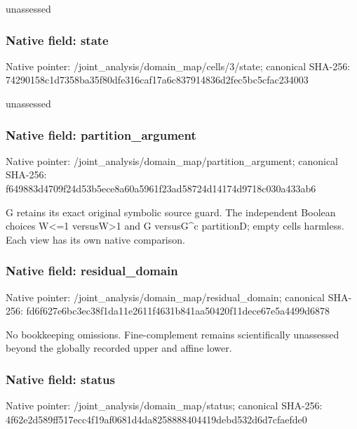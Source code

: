 \documentclass[10pt,a4paper]{article}
\begin{document}
\begingroup\raggedright\sloppy unassessed\par\endgroup

\subsubsection{Native field: state}
Native pointer: /joint\_\allowbreak{}analysis/domain\_\allowbreak{}map/cells/3/state; canonical SHA-256: 74290158c1d7358ba35f80dfe316caf17a6c837914836d2fec5bc5cfac234003

\begingroup\raggedright\sloppy unassessed\par\endgroup

\subsubsection{Native field: partition\_\allowbreak{}argument}
Native pointer: /joint\_\allowbreak{}analysis/domain\_\allowbreak{}map/partition\_\allowbreak{}argument; canonical SHA-256: f649883d4709f24d53b5ece8a60a5961f23ad58724d14174d9718c030a433ab6

\begingroup\raggedright\sloppy G retains its exact original symbolic source guard. The independent Boolean choices W<=\allowbreak{}1 versusW>1 and G versusG\textasciicircum{}c partitionD;\allowbreak{} empty cells harmless. Each view has its own native comparison.\par\endgroup

\subsubsection{Native field: residual\_\allowbreak{}domain}
Native pointer: /joint\_\allowbreak{}analysis/domain\_\allowbreak{}map/residual\_\allowbreak{}domain; canonical SHA-256: fd6f627e6bc3ec38f1da11e2611f4631b841aa50420f11dece67e5a4499d6878

\begingroup\raggedright\sloppy No bookkeeping omissions. Fine-complement remains scientifically unassessed beyond the globally recorded upper and affine lower.\par\endgroup

\subsubsection{Native field: status}
Native pointer: /joint\_\allowbreak{}analysis/domain\_\allowbreak{}map/status; canonical SHA-256: 4f62e2d589ff517ecc4f19af0681d4da8258888404419debd532d6d7cfaefde0
\end{document}
